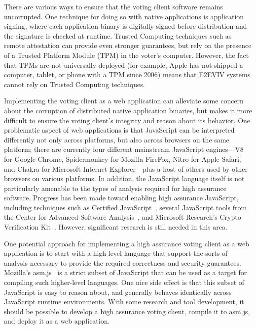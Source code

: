 There are various ways to ensure that the voting client software
remains uncorrupted. One technique for doing so with native
applications is application signing, where each application binary is
digitally signed before distribution and the signature is checked at
runtime. Trusted Computing techniques such as remote attestation can
provide even stronger guarantees, but rely on the presence of a
Trusted Platform Module (TPM) in the voter's computer.  However, the
fact that TPMs are not universally deployed (for example, Apple has
not shipped a computer, tablet, or phone with a TPM since 2006) means
that E2EVIV systems cannot rely on Trusted Computing techniques.

Implementing the voting client as a web application can alleviate some
concern about the corruption of distributed native application
binaries, but makes it more difficult to ensure the voting client's
integrity and reason about its behavior. One problematic aspect of web
applications is that JavaScript can be interpreted differently not
only across platforms, but also across browsers on the same platform;
there are currently four different mainstream JavaScript engines---V8
for Google Chrome, Spidermonkey for Mozilla FireFox, Nitro for Apple
Safari, and Chakra for Microsoft Internet Explorer---plus a host of
others used by other browsers on various platforms. In addition, the
JavaScript language itself is not particularly amenable to the types
of analysis required for high assurance software. Progress has been
made toward enabling high assurance JavaScript, including techniques
such as Certified JavaScript~\cite{JSCert}, several JavaScript tools
from the Center for Advanced Software Analysis~\cite{CASATools}, and
Microsoft Research's Crypto Verification Kit~\cite{CVK}. However,
significant research is still needed in this area.

One potential approach for implementing a high assurance voting client
as a web application is to start with a high-level language that
support the sorts of analysis necessary to provide the required
correctness and security guarantees.  Mozilla's asm.js~\cite{asm.js}
is a strict subset of JavaScript that can be used as a target for
compiling such higher-level languages. One nice side effect is that
this subset of JavaScript is easy to reason about, and generally
behaves identically across JavaScript runtime environments. With some
research and tool development, it should be possible to develop a high
assurance voting client, compile it to asm.js, and deploy it as a web
application.

